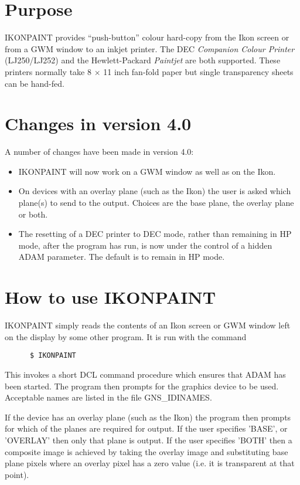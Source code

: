 \section{Purpose} 

IKONPAINT provides ``push-button'' colour hard-copy from the Ikon screen
or from a GWM window to an inkjet printer.
The DEC {\it Companion Colour Printer} (LJ250/LJ252) and the Hewlett-Packard
{\it Paintjet} are both supported.
These printers normally take 8 $\times$ 11 inch fan-fold paper but
single transparency sheets can be hand-fed. 

\section{Changes in version 4.0}
A number of changes have been made in version 4.0:
\begin{itemize}
\item IKONPAINT will now work on a GWM window as well as on the Ikon.
\item On devices with an overlay plane (such as the Ikon) the user is
asked which plane(s) to send to the output. Choices are the base plane,
the overlay plane or both.
\item The resetting of a DEC printer to DEC mode, rather than remaining
in HP mode, after the program has run, is now under the control of a
hidden ADAM parameter. The default is to remain in HP mode.
\end{itemize}

\section{How to use IKONPAINT}

IKONPAINT simply reads the contents of an Ikon screen or GWM window
left on the display by some other program. It is run with the command 
\begin{verbatim}
      $ IKONPAINT		    
\end{verbatim}
This invokes a short DCL command procedure which ensures that ADAM has
been started. The program then prompts for the graphics device to be
used. Acceptable names are listed in the file GNS\_IDINAMES.

If the device has an overlay plane (such as the Ikon) the program then
prompts for which of the planes are required for output. If the user
specifies 'BASE', or 'OVERLAY' then only that plane is output. If the
user specifies 'BOTH' then a composite image is achieved by
taking the overlay image and substituting base plane pixels where an
overlay pixel has a zero value (i.e. it is transparent at that point). 

